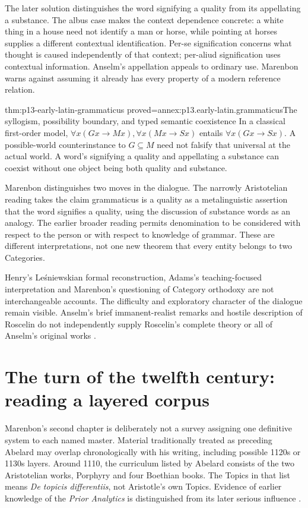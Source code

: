 The later solution distinguishes the word signifying a quality
from its appellating a substance. The albus case makes the context
dependence concrete: a white thing in a house need not identify
a man or horse, while pointing at horses supplies a different
contextual identification.
Per-se signification concerns what thought is caused independently
of that context; per-aliud signification uses contextual information.
Anselm's appellation appeals to ordinary use. Marenbon warns
against assuming it already has every property of a modern
reference relation.

\begin{hblemma}{thm:p13-early-latin-grammaticus}
 {proved=annex:p13.early-latin.grammaticus}{The syllogism, possibility boundary, and typed semantic coexistence}
In a classical first-order model,
\(\forall x(Gx\to Mx),\forall x(Mx\to Sx)\) entails
\(\forall x(Gx\to Sx)\).
A possible-world counterinstance to \(G\subseteq M\) need not
falsify that universal at the actual world.
A word's signifying a quality and appellating a substance can
coexist without one object being both quality and substance.
\end{hblemma}

Marenbon distinguishes two moves in the dialogue.
The narrowly Aristotelian reading takes the claim grammaticus
is a quality as a metalinguistic assertion that the word signifies
a quality, using the discussion of substance words as an analogy.
The earlier broader reading permits denomination to be considered
with respect to the person or with respect to knowledge of grammar.
These are different interpretations, not one new theorem that
every entity belongs to two Categories.

Henry's Le\'{s}niewskian formal reconstruction, Adams's teaching-focused
interpretation and Marenbon's questioning of Category orthodoxy
are not interchangeable accounts. The difficulty and exploratory
character of the dialogue remain visible.
Anselm's brief immanent-realist remarks and hostile description
of Roscelin do not independently supply Roscelin's complete
theory or all of Anselm's original works
\cite[pp.~51--57]{Marenbon2007FordhamEarlyLatin}.

\section{The turn of the twelfth century: reading a layered corpus}
\label{sec:p13-early-latin-turn-twelfth}

Marenbon's second chapter is deliberately not a survey assigning
one definitive system to each named master. Material traditionally
treated as preceding Abelard may overlap chronologically with
his writing, including possible 1120s or 1130s layers.
Around 1110, the curriculum listed by Abelard consists of the two
Aristotelian works, Porphyry and four Boethian books.
The Topics in that list means \emph{De topicis differentiis},
not Aristotle's own Topics. Evidence of earlier knowledge of
the \emph{Prior Analytics} is distinguished from its later serious
influence \cite[pp.~65--66]{Marenbon2007FordhamTurnTwelfth}.


